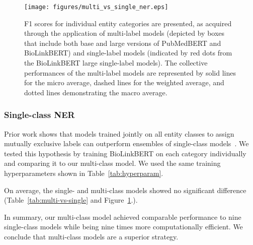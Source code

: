 \documentclass{bioinfo}
\begin{document}
\begin{figure}\centering
\texttt{[image: figures/multi\_vs\_single\_ner.eps]}
\caption{F1 scores for individual entity categories are presented, as acquired through the application of multi-label models (depicted by boxes that include both base and large versions of PubMedBERT and BioLinkBERT) and single-label models (indicated by red dots from the BioLinkBERT large single-label models). The collective performances of the multi-label models are represented by solid lines for the micro average, dashed lines for the weighted average, and dotted lines demonstrating the macro average.}
\label{fig:multi-vs-single}
\end{figure}

\subsubsection{Single-class NER}\label{sec:single-class}

Prior work shows that models trained jointly on all entity classes to assign mutually exclusive labels can outperform ensembles of single-class models~\citep[e.g.,][]{mtbioner, Tong2021AMA}. We tested this hypothesis by training BioLinkBERT on each category individually and comparing it to our multi-class model. We used the same training hyperparameters shown in Table~\ref{tab:hyperparam}.

On average, the single- and multi-class models showed no significant difference (Table~\ref{tab:multi-vs-single} and Figure~\ref{fig:multi-vs-single}.).

In summary, our multi-class model achieved comparable performance to nine single-class models while being nine times more computationally efficient. We conclude that multi-class models are a superior strategy.
\end{document}
